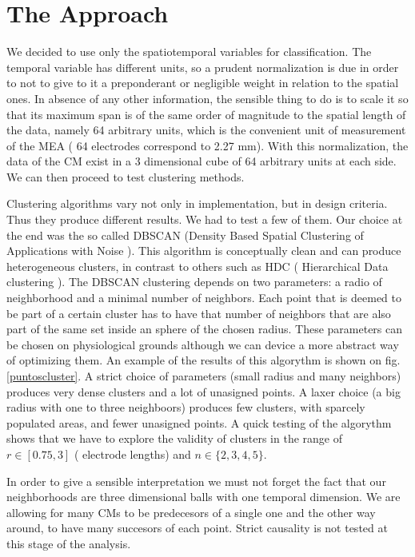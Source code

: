 \documentclass{article}
\begin{document}
\section{The Approach}

We decided to  use only the spatiotemporal variables for classification. 
The temporal variable has different units, so a prudent normalization is due
in order to not to give to it a preponderant or negligible weight in relation to the
spatial ones. In absence of any other information, the sensible thing to do is to
scale it so that its maximum span is of the same order of magnitude to the
spatial length of the data, namely 64 arbitrary units, which is the convenient unit
of measurement of the MEA ( 64 electrodes correspond to 2.27 mm).
With this normalization, the data of the CM exist in a 3 dimensional cube of 64
arbitrary units at each  side. We can then proceed to test clustering methods.


Clustering algorithms vary not only in implementation, but in design criteria.
Thus they produce different results. We had to test a few of them. Our choice at the
end was the so called DBSCAN
(Density Based Spatial Clustering of Applications with Noise \cite{DBSCAN}).
This algorithm is conceptually clean and can produce heterogeneous clusters, in contrast
to others such as HDC ( Hierarchical Data clustering \cite{ClustHB}).
The DBSCAN clustering depends
on two parameters: a radio of neighborhood and a minimal number of neighbors. Each
point that is deemed to be part of a certain cluster has to have that number of neighbors
that are also part of the same set inside an sphere of the chosen radius. These
parameters can be chosen on physiological grounds although we can device a more
abstract way of optimizing them. An example of the results of this
algorythm is shown on fig. \ref{puntoscluster}.
A strict choice of parameters (small radius and many neighbors) produces
very dense clusters and a lot of unasigned points. A laxer choice (a big radius
with one to three neighboors) produces few clusters, with sparcely populated
areas,  and fewer unasigned points. A quick testing of the algorythm 
shows that we have to explore the validity of clusters in the range of
$r \in [0.75, 3 ]$ ( electrode lengths) and $ n \in \lbrace 2,3,4,5 \rbrace$.

In order to give a sensible interpretation we must not forget the
fact that
our neighborhoods are three dimensional balls with one temporal dimension.
We are allowing for many CMs to be predecesors of a single one and
the other way around, to have many succesors of each point. Strict causality
is not tested at this stage of the analysis. 
\end{document}

